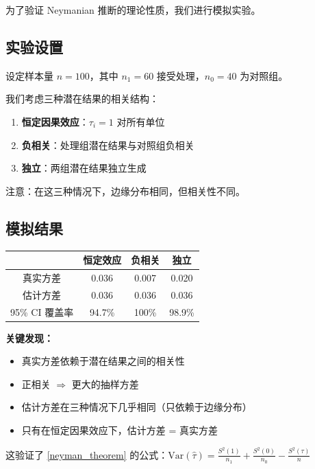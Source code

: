 为了验证 Neymanian 推断的理论性质，我们进行模拟实验。

\subsection{实验设置}

设定样本量 $n = 100$，其中 $n_1 = 60$ 接受处理，$n_0 = 40$ 为对照组。

我们考虑三种潜在结果的相关结构：
\begin{enumerate}
  \item \textbf{恒定因果效应}：$\tau_i = 1$ 对所有单位
  \item \textbf{负相关}：处理组潜在结果与对照组负相关
  \item \textbf{独立}：两组潜在结果独立生成
\end{enumerate}

注意：在这三种情况下，边缘分布相同，但相关性不同。

\subsection{模拟结果}

\begin{center}
\begin{tabular}{c|c|c|c}
\hline
 & 恒定效应 & 负相关 & 独立 \\
\hline
真实方差 & 0.036 & 0.007 & 0.020 \\
估计方差 & 0.036 & 0.036 & 0.036 \\
95\% CI 覆盖率 & 94.7\% & 100\% & 98.9\% \\
\hline
\end{tabular}
\end{center}

\textbf{关键发现：}
\begin{itemize}
  \item 真实方差依赖于潜在结果之间的相关性
  \item 正相关 $\Rightarrow$ 更大的抽样方差
  \item 估计方差在三种情况下几乎相同（只依赖于边缘分布）
  \item 只有在恒定因果效应下，估计方差 = 真实方差
\end{itemize}

这验证了 \cref{neyman_theorem} 的公式：$\text{Var}(\hat{\tau}) = \frac{S^2(1)}{n_1} + \frac{S^2(0)}{n_0} - \frac{S^2(\tau)}{n}$


